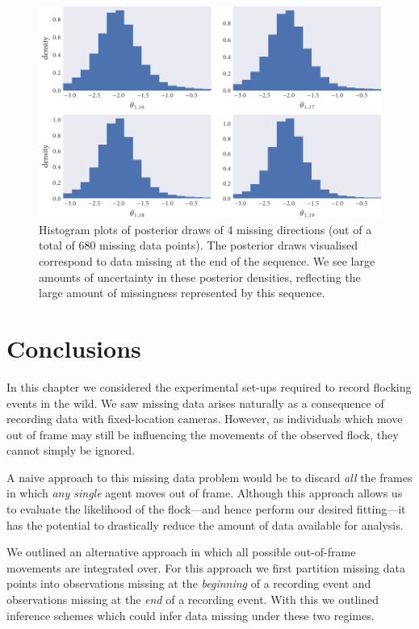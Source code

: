 \begin{figure}[tb]
  \includegraphics{dir_hist.pdf}
  \caption{Histogram plots of posterior draws of 4 missing directions (out of
    a total of 680 missing data points). The posterior draws visualised
    correspond to data missing at the end of the sequence. We see large amounts
    of uncertainty in these posterior densities, reflecting the large amount of
    missingness represented by this sequence.}
  \label{fig:dir_hist}
\end{figure}

\section*{Conclusions}

In this chapter we considered the experimental set-ups required to record
flocking events in the wild. We saw missing data arises naturally as a
consequence of recording data with fixed-location cameras. However, as
individuals which move out of frame may still be influencing the movements
of the observed flock, they cannot simply be ignored.

A naive approach to this missing data problem would be to discard \emph{all}
the frames in which \emph{any single} agent moves out of frame. Although this
approach allows us to evaluate the likelihood of the flock---and hence perform
our desired fitting---it has the potential to drastically reduce the amount of
data available for analysis.

We outlined an alternative approach in which all possible out-of-frame
movements are integrated over. For this approach we first partition missing
data points into observations missing at the \emph{beginning} of a recording
event and observations missing at the \emph{end} of a recording event. With this
we outlined inference schemes which could infer data missing under these two
regimes.

